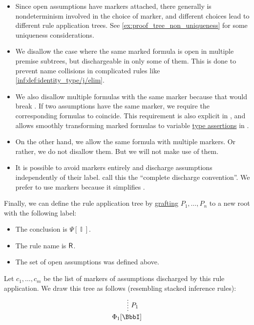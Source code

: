 \begin{definition}
\begin{thmenum}[resume=def:propositional_natural_deduction_proof_tree]
\begin{itemize}
      \item Since open assumptions have markers attached, there generally is nondeterminism involved in the choice of marker, and different choices lead to different rule application trees. See \cref{ex:proof_tree_non_uniqueness} for some uniqueness considerations.

      \item We disallow the case where the same marked formula is open in multiple premise subtrees, but dischargeable in only some of them. This is done to prevent name collisions in complicated rules like \ref{inf:def:identity_type/j/elim}.

      \item We also disallow multiple formulas with the same marker because that would break . If two assumptions have the same marker, we require the corresponding formulas to coincide. This requirement is also explicit in \cite[\S 2.1.8]{TroelstraSchwichtenberg2000BasicProofTheory}, and allows smoothly transforming marked formulas to variable \hyperref[def:type_assertion]{type assertions} in .

      \item On the other hand, we allow the same formula with multiple markers. Or rather, we do not disallow them. But we will not make use of them.

      \item It is possible to avoid markers entirely and discharge assumptions independently of their label.  call this the \enquote{complete discharge convention}. We prefer to use markers because it simplifies .
    \end{itemize}

    Finally, we can define the rule application tree by \hyperref[def:ordered_tree_grafting_product]{grafting} \( P_1, \ldots, P_n \) to a new root with the following label:
    \begin{itemize}
      \item The conclusion is \( \Psi[\BbbI] \).
      \item The rule name is \( \textsf{\upshape R} \).
      \item The set of open assumptions was defined above.
    \end{itemize}

    Let \( c_1, \ldots, c_m \) be the list of markers of assumptions discharged by this rule application. We draw this tree as follows (resembling stacked inference rules):
    \begin{equation*}
      \begin{prooftree}
        \hypo{}
        \ellipsis { \( P_1 \) } { \Phi_1[\BbbI] }


\end{prooftree}
\end{equation*}
\end{thmenum}
\end{definition}
